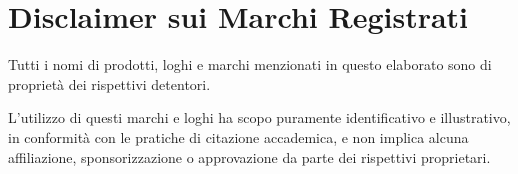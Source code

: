
\chapter*{Disclaimer sui Marchi Registrati}

\begin{center}
    \parbox{0.8\textwidth}{
        \centering
        Tutti i nomi di prodotti, loghi e marchi menzionati in questo elaborato sono di proprietà dei rispettivi detentori.

        \vspace{1em}

        L'utilizzo di questi marchi e loghi ha scopo puramente identificativo e illustrativo, in conformità con le pratiche di citazione accademica, e non implica alcuna affiliazione, sponsorizzazione o approvazione da parte dei rispettivi proprietari.
    }
\end{center}

\clearpage
